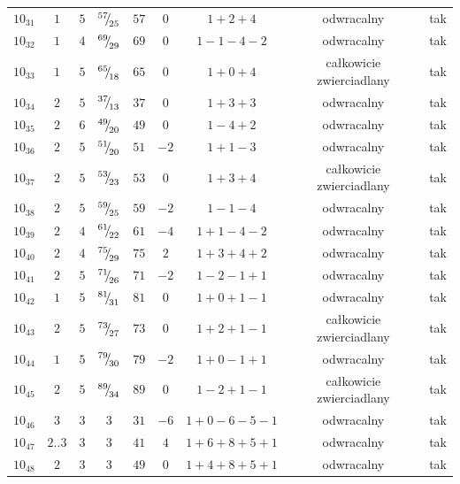 \begin{longtable}{ccccccccc}
$10_{31}$ & $1$ & $5$ & ${}^{57}{\mskip -5mu/\mskip -3mu}_{25}$ & $57$ & $0$ & $1+2+4$ & odwracalny & tak \\
$10_{32}$ & $1$ & $4$ & ${}^{69}{\mskip -5mu/\mskip -3mu}_{29}$ & $69$ & $0$ & $1-1-4-2$ & odwracalny & tak \\
$10_{33}$ & $1$ & $5$ & ${}^{65}{\mskip -5mu/\mskip -3mu}_{18}$ & $65$ & $0$ & $1+0+4$ & całkowicie zwierciadlany & tak \\
$10_{34}$ & $2$ & $5$ & ${}^{37}{\mskip -5mu/\mskip -3mu}_{13}$ & $37$ & $0$ & $1+3+3$ & odwracalny & tak \\
$10_{35}$ & $2$ & $6$ & ${}^{49}{\mskip -5mu/\mskip -3mu}_{20}$ & $49$ & $0$ & $1-4+2$ & odwracalny & tak \\
$10_{36}$ & $2$ & $5$ & ${}^{51}{\mskip -5mu/\mskip -3mu}_{20}$ & $51$ & $-2$ & $1+1-3$ & odwracalny & tak \\
$10_{37}$ & $2$ & $5$ & ${}^{53}{\mskip -5mu/\mskip -3mu}_{23}$ & $53$ & $0$ & $1+3+4$ & całkowicie zwierciadlany & tak \\
$10_{38}$ & $2$ & $5$ & ${}^{59}{\mskip -5mu/\mskip -3mu}_{25}$ & $59$ & $-2$ & $1-1-4$ & odwracalny & tak \\
$10_{39}$ & $2$ & $4$ & ${}^{61}{\mskip -5mu/\mskip -3mu}_{22}$ & $61$ & $-4$ & $1+1-4-2$ & odwracalny & tak \\
$10_{40}$ & $2$ & $4$ & ${}^{75}{\mskip -5mu/\mskip -3mu}_{29}$ & $75$ & $2$ & $1+3+4+2$ & odwracalny & tak \\
$10_{41}$ & $2$ & $5$ & ${}^{71}{\mskip -5mu/\mskip -3mu}_{26}$ & $71$ & $-2$ & $1-2-1+1$ & odwracalny & tak \\
$10_{42}$ & $1$ & $5$ & ${}^{81}{\mskip -5mu/\mskip -3mu}_{31}$ & $81$ & $0$ & $1+0+1-1$ & odwracalny & tak \\
$10_{43}$ & $2$ & $5$ & ${}^{73}{\mskip -5mu/\mskip -3mu}_{27}$ & $73$ & $0$ & $1+2+1-1$ & całkowicie zwierciadlany & tak \\
$10_{44}$ & $1$ & $5$ & ${}^{79}{\mskip -5mu/\mskip -3mu}_{30}$ & $79$ & $-2$ & $1+0-1+1$ & odwracalny & tak \\
$10_{45}$ & $2$ & $5$ & ${}^{89}{\mskip -5mu/\mskip -3mu}_{34}$ & $89$ & $0$ & $1-2+1-1$ & całkowicie zwierciadlany & tak \\
$10_{46}$ & $3$ & $3$ & $3$ & $31$ & $-6$ & $1+0-6-5-1$ & odwracalny & tak \\
$10_{47}$ & $2..3$ & $3$ & $3$ & $41$ & $4$ & $1+6+8+5+1$ & odwracalny & tak \\
$10_{48}$ & $2$ & $3$ & $3$ & $49$ & $0$ & $1+4+8+5+1$ & odwracalny & tak \\

\end{longtable}
